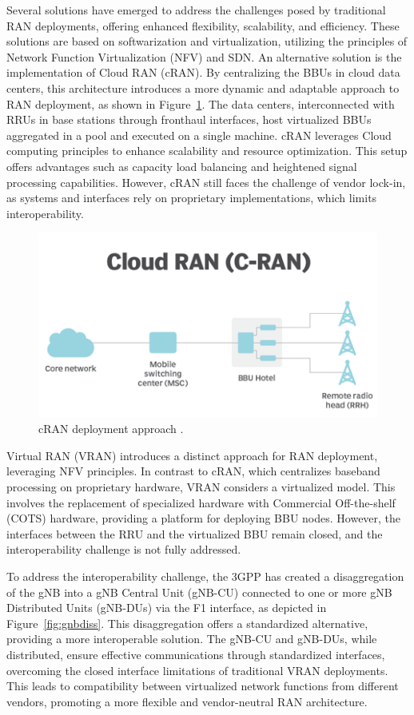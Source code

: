 Several solutions have emerged to address the challenges posed by traditional RAN deployments, offering enhanced flexibility, scalability, and efficiency.
These solutions are based on softwarization and virtualization, utilizing the principles of Network Function Virtualization (NFV) and SDN. An alternative solution is the implementation of Cloud RAN (cRAN). By centralizing the BBUs in cloud data centers, this architecture introduces a more dynamic and adaptable approach to RAN deployment, as shown in Figure~\ref{fig:cRAN}.
The data centers, interconnected with RRUs in base stations through fronthaul interfaces, host virtualized BBUs aggregated in a pool and executed on a single machine.
cRAN leverages Cloud computing principles to enhance scalability and resource optimization.
This setup offers advantages such as capacity load balancing and heightened signal processing capabilities.
However, cRAN still faces the challenge of vendor lock-in, as systems and interfaces rely on proprietary implementations, which limits interoperability.

\begin{figure}[H]
    \centering
    \includegraphics[width=0.5\linewidth]{figures/cRAN}
    \caption[cRAN deployment approach]{cRAN deployment approach \cite{cRAN}.}
    \label{fig:cRAN}
\end{figure}

Virtual RAN (VRAN) introduces a distinct approach for RAN deployment, leveraging NFV principles.
In contrast to cRAN, which centralizes baseband processing on proprietary hardware, VRAN considers a virtualized model.
This involves the replacement of specialized hardware with Commercial Off-the-shelf (COTS) hardware, providing a platform for deploying BBU nodes.
However, the interfaces between the RRU and the virtualized BBU remain closed, and the interoperability challenge is not fully addressed.


To address the interoperability challenge, the 3GPP has created a disaggregation of the gNB into a gNB Central Unit (gNB-CU) connected to one or more gNB Distributed Units (gNB-DUs) via the F1 interface, as depicted in Figure~\ref{fig:gnbdiss}.
This disaggregation offers a standardized alternative, providing a more interoperable solution.
The gNB-CU and gNB-DUs, while distributed, ensure effective communications through standardized interfaces, overcoming the closed interface limitations of traditional VRAN deployments.
This leads to compatibility between virtualized network functions from different vendors, promoting a more flexible and vendor-neutral RAN architecture.

